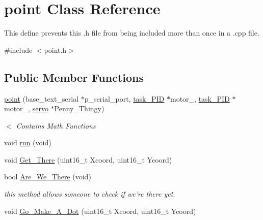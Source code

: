 \hypertarget{classpoint}{\section{point Class Reference}
\label{classpoint}
}


This define prevents this .h file from being included more than once in a .cpp file.  




{\ttfamily \#include $<$point.\-h$>$}

\subsection*{Public Member Functions}
\begin{DoxyCompactItemize}
\item 
\hyperlink{classpoint_a74f05b63149c2931870fdb68a10c6ba9}{point} (base\-\_\-text\-\_\-serial $\ast$p\-\_\-serial\-\_\-port, \hyperlink{classtask___p_i_d}{task\-\_\-\-P\-I\-D} $\ast$motor\-\_, \hyperlink{classtask___p_i_d}{task\-\_\-\-P\-I\-D} $\ast$motor\-\_, \hyperlink{classservo}{servo} $\ast$Penny\-\_\-\-Thingy)
\begin{DoxyCompactList}\small\item\em $<$ Contains Math Functions \end{DoxyCompactList}\item 
void \hyperlink{classpoint_ab52a800806170858caf2ad323e2dce55}{run} (void)
\item 
void \hyperlink{classpoint_a5ced7e6ba6d4ee79d48bd762ac5f3fee}{Get\-\_\-\-There} (uint16\-\_\-t Xcoord, uint16\-\_\-t Ycoord)
\item 
\hypertarget{classpoint_a12d2d37f3c39c4ffdb51f1d38e3d933e}{bool \hyperlink{classpoint_a12d2d37f3c39c4ffdb51f1d38e3d933e}{Are\-\_\-\-We\-\_\-\-There} (void)}\label{classpoint_a12d2d37f3c39c4ffdb51f1d38e3d933e}

\begin{DoxyCompactList}\small\item\em this method allows someone to check if we're there yet. \end{DoxyCompactList}\item 
void \hyperlink{classpoint_a67895bcb2b18dd568041f66c201a5943}{Go\-\_\-\-Make\-\_\-\-A\-\_\-\-Dot} (uint16\-\_\-t Xcoord, uint16\-\_\-t Ycoord)
\end{DoxyCompactItemize}
